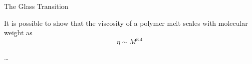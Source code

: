 \begin{activity}{The Glass Transition}
\begin{exercises}
	\exercise It is possible to show that the viscosity of a polymer melt scales with molecular weight as
		\begin{equation*}
			\eta \sim M^{3.4}
		\end{equation*}
		
		\dots
	
\end{exercises}


%
%	


	
\end{activity}